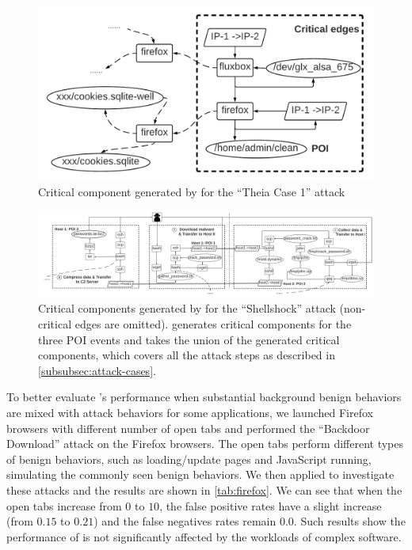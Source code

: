\begin{figure}[t]
    \centering
    \includegraphics[width=\linewidth]{figs/darpa2.pdf}
    \caption{Critical component generated by \tool for the ``Theia Case 1'' attack}
    \label{fig:darpa}
\end{figure} 
\begin{figure}[t]
    \centering
    \includegraphics[width=\textwidth, clip]{figs/multihost.pdf}
    \caption{Critical components generated by \tool for the ``Shellshock'' attack (non-critical edges are omitted). \tool generates critical components for the three POI events and takes the union of the generated critical components, which covers all the attack steps as described in \cref{subsubsec:attack-cases}.}
    \label{fig:multi}
\end{figure}



To better evaluate \tool's performance when substantial background benign behaviors are mixed with attack behaviors for some applications, we launched Firefox browsers with different number of open tabs and performed the ``Backdoor Download'' attack on the Firefox browsers.
The open tabs perform different types of benign behaviors, such as loading/update pages and JavaScript running, simulating the commonly seen benign behaviors.
We then applied \tool to investigate these attacks and the results are shown in \cref{tab:firefox}. 
We can see that when the open tabs increase from $0$ to $10$, 
the false positive rates have a slight increase (from $0.15$ to $0.21$)
and the false negatives rates remain $0.0$. 
Such results show the performance of \tool is not significantly affected by the workloads of complex software.


